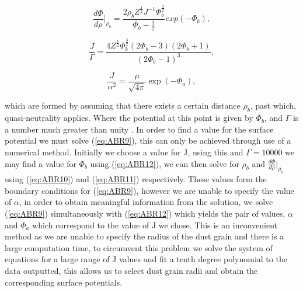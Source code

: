 \documentclass[journal]{Imperial_lab_report}
\begin{document}
 \begin{equation}\label{eq:ABR11}
{\frac{d\Phi}{d\rho}\biggr|_{\rho_b} = \frac{2\rho_b Z^{\frac{1}{2}} J^{-1} \Phi_b^{\frac{3}{2}}}{\Phi_b - \frac{1}{2}} exp{(-\Phi_b)}},
 \end{equation}
 
\begin{equation}\label{eq:ABR13}
{\frac{J}{\Gamma} = \frac{4Z^{\frac{1}{2}}\Phi_b^{\frac{3}{2}}(2\Phi_b - 3)(2\Phi_b + 1)}{(2\Phi_b - 1)^3}},
\end{equation}

\begin{equation}\label{eq:ABR12}
{\frac{J}{\alpha^2} = \frac{\mu}{\sqrt{4\pi}} \exp{\left(-\Phi_a\right)}},
\end{equation}


which are formed by assuming that there exists a certain distance $\rho_b$, past which, quasi-neutrality applies. Where the potential at this point is given by $\Phi_b$, and $\Gamma$ is a number much greater than unity \cite{ABR}. In order to find a value for the surface potential we must solve (\ref{eq:ABR9}), this can only be achieved through use of a numerical method. Initially we choose a value for J, using this and $\Gamma = 10000$ we may find a value for $\Phi_b$ using (\ref{eq:ABR12}), we can then solve for $\rho_b$ and $\frac{d\Phi}{d\rho}\biggr|_{\rho_b}$ using (\ref{eq:ABR10}) and (\ref{eq:ABR11}) respectively. These values form the boundary conditions for (\ref{eq:ABR9}), however we are unable to specify the value of $\alpha$, in order to obtain meaningful information from the solution, we solve  (\ref{eq:ABR9}) simultaneously with (\ref{eq:ABR12}) which yields the pair of values, $\alpha$ and $\Phi_a$ which correspond to the value of J we chose. This is an inconvenient method as we are unable to specify the radius of the dust grain and there is a large computation time, to circumvent this problem we solve the system of equations for a large range of J values and fit a tenth degree polynomial to the data outputted, this allows us to select dust grain radii and obtain the corresponding surface potentials. 

\smallskip
\end{document}
